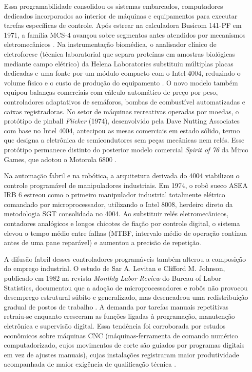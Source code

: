 Essa programabilidade consolidou os sistemas embarcados, computadores dedicados incorporados ao interior de máquinas e equipamentos para executar tarefas específicas de controle. Após estrear na calculadora Busicom 141-PF em 1971, a família MCS-4 avançou sobre segmentos antes atendidos por mecanismos eletromecânicos \cite{chm2007panel, intel1988annualreport}. Na instrumentação biomédica, o analisador clínico de eletroforese (técnica laboratorial que separa proteínas em amostras biológicas mediante campo elétrico) da Helena Laboratories substituiu múltiplas placas dedicadas e uma fonte por um módulo compacto com o Intel 4004, reduzindo o volume físico e o custo de produção do equipamento \cite{intel1988annualreport}. O novo modelo também equipou balanças comerciais com cálculo automático de preço por peso, controladores adaptativos de semáforos, bombas de combustível automatizadas e caixas registradoras. No setor de máquinas recreativas operadas por moedas, o protótipo de pinball \textit{Flicker} (1974), desenvolvido pela Dave Nutting Associates com base no Intel 4004, antecipou as mesas comerciais em estado sólido, termo que designa a eletrônica de semicondutores sem peças mecânicas nem relés. Esse protótipo permanece distinto do posterior modelo comercial \textit{Spirit of 76} da Mirco Games, que adotou o Motorola 6800 \cite{faggin1996, faggin2021, intel1988annualreport}.

Na automação fabril e na robótica, a arquitetura derivada do 4004 viabilizou o controle programável de manipuladores industriais. Em 1974, o robô sueco ASEA IRB 6 estreou como o primeiro manipulador industrial totalmente elétrico comandado por microprocessador, utilizando o Intel 8008, herdeiro direto da metodologia SGT consolidada no 4004. Ao substituir relés eletromecânicos, contadores analógicos e longos chicotes de fiação por controle digital, o sistema elevou o tempo médio entre falhas (MTBF, intervalo médio de operação contínua antes de uma pane reparável) e aumentou a precisão de repetição.

A difusão fabril desses controladores programáveis também alterou a composição do emprego industrial. O estudo de Sar A. Levitan e Clifford M. Johnson, publicado em 1982 na revista \textit{Monthly Labor Review} do Bureau of Labor Statistics, documentou que a adoção de microprocessadores e robôs não provocou desemprego estrutural súbito e generalizado, mas desencadeou uma redistribuição gradual de postos de trabalho \cite{bls1982futurework}. A demanda por tarefas manuais repetitivas retraiu-se enquanto cresceram as funções ligadas à programação, manutenção eletrônica e supervisão digital. Essa tendência foi corroborada por estudos econômicos sobre máquinas CNC (máquinas-ferramenta de comando numérico computadorizado, cujos movimentos de corte são guiados por programas digitais em vez de ajustes manuais), cujas instalações registraram maior produtividade acompanhada de maior exigência de qualificação técnica \cite{nber2022cnc}.

